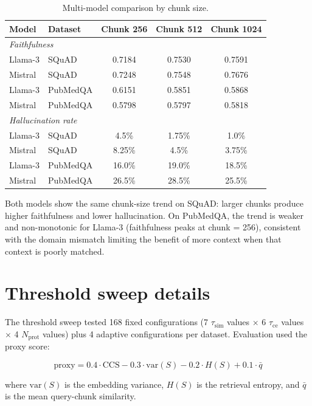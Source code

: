 \begin{table}[!htb]
\centering
\caption{Multi-model comparison by chunk size.}
\label{tab:multimodel}
\small
\begin{tabular}{llccc}
\toprule
Model & Dataset & Chunk 256 & Chunk 512 & Chunk 1024 \\
\midrule
\multicolumn{5}{l}{\emph{Faithfulness}} \\
Llama-3  & SQuAD    & 0.7184 & 0.7530 & 0.7591 \\
Mistral  & SQuAD    & 0.7248 & 0.7548 & 0.7676 \\
Llama-3  & PubMedQA & 0.6151 & 0.5851 & 0.5868 \\
Mistral  & PubMedQA & 0.5798 & 0.5797 & 0.5818 \\
\midrule
\multicolumn{5}{l}{\emph{Hallucination rate}} \\
Llama-3  & SQuAD    & 4.5\%  & 1.75\% & 1.0\% \\
Mistral  & SQuAD    & 8.25\% & 4.5\%  & 3.75\% \\
Llama-3  & PubMedQA & 16.0\% & 19.0\% & 18.5\% \\
Mistral  & PubMedQA & 26.5\% & 28.5\% & 25.5\% \\
\bottomrule
\end{tabular}
\end{table}

Both models show the same chunk-size trend on SQuAD: larger chunks
produce higher faithfulness and lower hallucination. On PubMedQA, the
trend is weaker and non-monotonic for Llama-3 (faithfulness peaks at
chunk = 256), consistent with the domain mismatch limiting the benefit
of more context when that context is poorly matched.

\FloatBarrier
\section{Threshold sweep details}
\label{app:sweep}

The threshold sweep tested 168 fixed configurations
(7 $\tau_\text{sim}$ values $\times$ 6 $\tau_\text{ce}$ values
$\times$ 4 $N_\text{prot}$ values) plus 4 adaptive configurations
per dataset. Evaluation used the proxy score:

\begin{equation}
  \text{proxy} = 0.4 \cdot \text{CCS} - 0.3 \cdot \text{var}(S)
               - 0.2 \cdot H(S) + 0.1 \cdot \bar{q}
\end{equation}

\noindent where $\text{var}(S)$ is the embedding variance,
$H(S)$ is the retrieval entropy, and $\bar{q}$ is the mean
query-chunk similarity.

